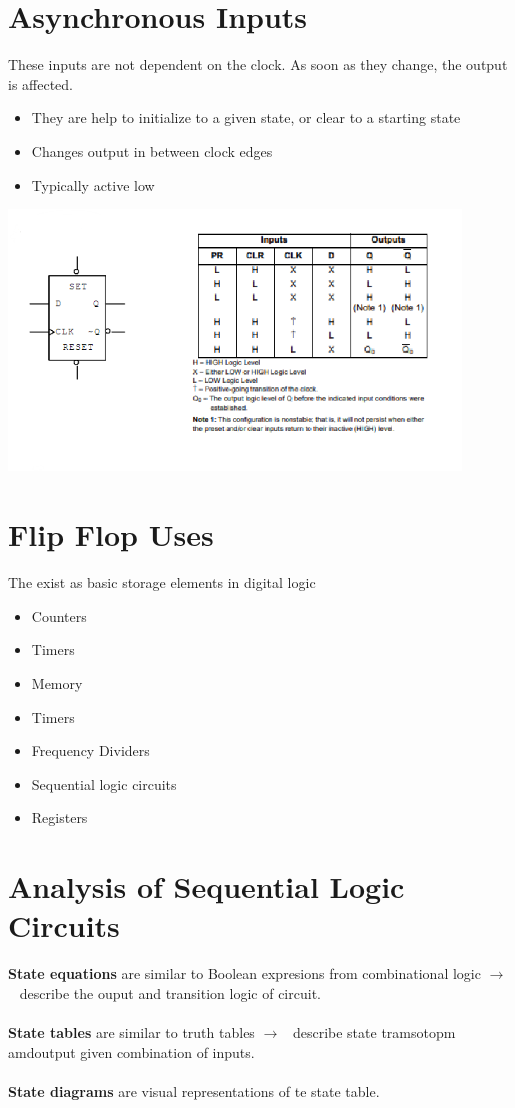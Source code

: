 \documentclass[a4paper,12pt]{article}
\newcommand{\ra}{$\rightarrow$}
\begin{document}
    \section{Asynchronous Inputs}
        These inputs are not dependent on the clock. As soon as they change, the output is affected.
        \begin{itemize}
          \item They are help to initialize to a given state, or clear to a starting state
          \item Changes output in between clock edges
          \item Typically active low
        \end{itemize}
        \includegraphics[width=12cm]{AsyncInputs.png}
    \section{Flip Flop Uses}
        The exist as basic storage elements in digital logic
        \begin{itemize}
          \item Counters
          \item Timers
          \item Memory
          \item Timers
          \item Frequency Dividers
          \item Sequential logic circuits
          \item Registers
        \end{itemize}
      \section{Analysis of Sequential Logic Circuits}
        \textbf{State equations} are similar to Boolean expresions from combinational logic \ra~ describe the ouput and transition logic of circuit.\\ \\
        \textbf{State tables} are similar to truth tables \ra~ describe state tramsotopm amdoutput given combination of inputs.\\ \\\textbf{State diagrams} are visual representations of te state table.
\end{document}
